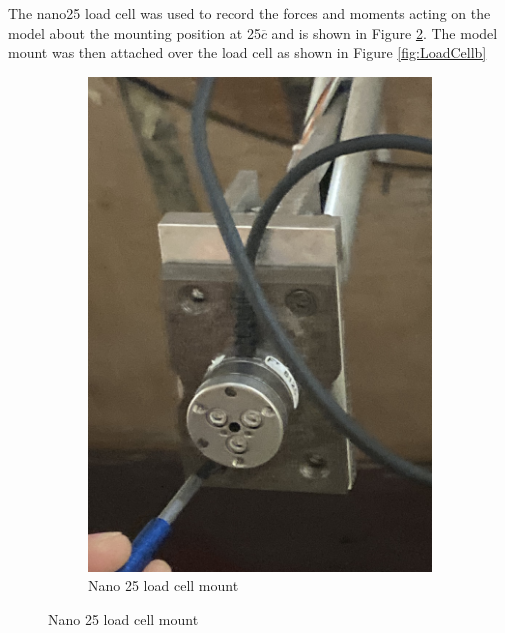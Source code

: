 \begin{figure}[H]
\end{figure}


The nano25 load cell was used to record the forces and moments acting on the model about the mounting position at 25$\overline{c}$ and is shown in Figure \ref{fig:LoadCella}. The model mount was then attached over the load cell as shown in Figure \ref{fig:LoadCellb}

\begin{figure}[H]
    \centering
    \begin{subfigure}[b]{0.3\textwidth}
        \centering
        \includegraphics[scale=0.08]{04_Methodology/Figs/loadCellMount}
        \caption{Nano 25 load cell mount}
        \label{fig:LoadCella}
    \end{subfigure}


\end{figure}
